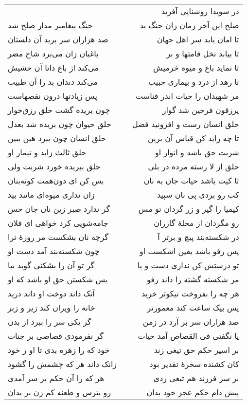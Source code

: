 \begin{center}
\begin{longtable}{l p{0.5cm} r}
&&
در سویدا روشنایی آفرید
\\
جنگ پیغامبر مدار صلح شد
&&
صلح این آخر زمان زان جنگ بد
\\
صد هزاران سر برید آن دلستان
&&
تا امان یابد سر اهل جهان
\\
باغبان زان می‌برد شاخ مضر
&&
تا بیابد نخل قامتها و بر
\\
می‌کند از باغ دانا آن حشیش
&&
تا نماید باغ و میوه خرمیش
\\
می‌کند دندان بد را آن طبیب
&&
تا رهد از درد و بیماری حبیب
\\
پس زیادتها درون نقصهاست
&&
مر شهیدان را حیات اندر فناست
\\
چون بریده گشت حلق رزق‌خوار
&&
یرزقون فرحین شد گوار
\\
حلق حیوان چون بریده شد بعدل
&&
حلق انسان رست و افزونید فضل
\\
حلق انسان چون ببرد هین ببین
&&
تا چه زاید کن قیاس آن برین
\\
حلق ثالث زاید و تیمار او
&&
شربت حق باشد و انوار او
\\
حلق ببریده خورد شربت ولی
&&
حلق از لا رسته مرده در بلی
\\
بس کن ای دون‌همت کوته‌بنان
&&
تا کیت باشد حیات جان به نان
\\
زان نداری میوه‌ای مانند بید
&&
کب رو بردی پی نان سپید
\\
گر ندارد صبر زین نان جان حس
&&
کیمیا را گیر و زر گردان تو مس
\\
جامه‌شویی کرد خواهی ای فلان
&&
رو مگردان از محلهٔ گازران
\\
گرچه نان بشکست مر روزهٔ ترا
&&
در شکسته‌بند پیچ و برتر آ
\\
چون شکسته‌بند آمد دست او
&&
پس رفو باشد یقین اشکست او
\\
گر تو آن را بشکنی گوید بیا
&&
تو درستش کن نداری دست و پا
\\
پس شکستن حق او باشد که او
&&
مر شکسته گشته را داند رفو
\\
آنک داند دوخت او داند درید
&&
هر چه را بفروخت نیکوتر خرید
\\
خانه را ویران کند زیر و زبر
&&
پس بیک ساعت کند معمورتر
\\
گر یکی سر را ببرد از بدن
&&
صد هزاران سر بر آرد در زمن
\\
گر نفرمودی قصاصی بر جنات
&&
یا نگفتی فی القصاص آمد حیات
\\
خود که را زهره بدی تا او ز خود
&&
بر اسیر حکم حق تیغی زند
\\
زانک داند هر که چشمش را گشود
&&
کان کشنده سخرهٔ تقدیر بود
\\
هر که را آن حکم بر سر آمدی
&&
بر سر فرزند هم تیغی زدی
\\
رو بترس و طعنه کم زن بر بدان
&&
پیش دام حکم عجز خود بدان
\\
\end{longtable}
\end{center}
